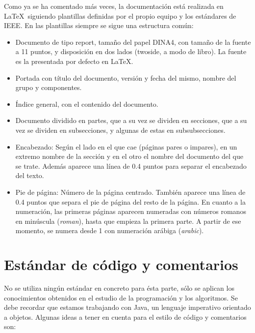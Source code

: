 \documentclass[spanish,a4paper,11pt, twoside]{report}	%
\begin{document}
	Como ya se ha comentado más veces, la documentación está realizada en \LaTeX \ siguiendo plantillas definidas por el propio equipo y los estándares de IEEE. En las plantillas siempre se sigue una estructura común:
	\begin{itemize}
		\item Documento de tipo report, tamaño del papel DINA4, con tamaño de la fuente a 11 puntos, y disposición en dos lados (twoside, a modo de libro). La fuente es la presentada por defecto en \LaTeX.
		\item Portada con título del documento, versión y fecha del mismo, nombre del grupo y componentes.
		\item Índice general, con el contenido del documento.
		\item Documento dividido en partes, que a su vez se dividen en secciones, que a su vez se dividen en subsecciones, y algunas de estas en subsubsecciones.
		\item Encabezado: Según el lado en el que cae (páginas pares o impares),  en un extremo nombre de la sección y en el otro el nombre del documento del que se trate. Además aparece una línea de 0.4 puntos para separar el encabezado del texto.
		\item Pie de página: Número de la página centrado. También aparece una línea de 0.4 puntos que separa el pie de página del resto de la página. En cuanto a la numeración, las primeras páginas aparecen numeradas con números romanos en minúscula (\textit{roman}), hasta que empieza la primera parte. A partir de ese momento, se numera desde 1 con numeración arábiga (\textit{arabic}).
	\end{itemize}

	\section{Estándar de código y comentarios}
	
	No se utiliza ningún estándar en concreto para ésta parte, sólo se aplican los conocimientos obtenidos en el estudio de la programación y los algoritmos. Se debe recordar que estamos trabajando con Java, un lenguaje imperativo orientado a objetos. Algunas ideas a tener en cuenta para el estilo de código y comentarios son:
\end{document}
